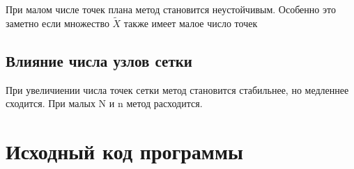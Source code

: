 При малом числе точек плана метод становится неустойчивым.
Особенно это заметно если множество $\tilde{X}$ также имеет малое число точек
\vspace{30mm}



\subsection{Влияние числа узлов сетки}

При увеличиении числа точек сетки метод становится стабильнее, но медленнее сходится.
При малых N и n метод расходится.



\section{Исходный код программы}
